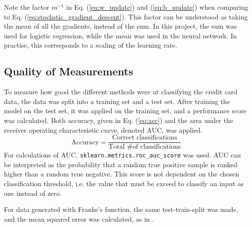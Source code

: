 Note the factor $m^{-1}$ in Eq. (\ref{eq:w_update}) and (\ref{eq:b_update}) when comparing to Eq. (\ref{eq:stochstic_gradient_descent}). This factor can be understood as taking the mean of all the gradients, instead of the sum. In this project, the sum was used for logistic regression, while the mean was used in the neural network. In practise, this corresponds to a scaling of the learning rate.

\subsection{Quality of Measurements}
To measure how good the different methods were at classifying the credit card data, the data was split into a training set and a test set. After training the model on the test set, it was applied on the training set, and a performance score was calculated. Both accuracy, given in Eq. (\ref{eq:acc}) and the area under the receiver operating characteristic curve, denoted AUC, was applied.
\begin{equation}\label{eq:acc}
  \text{Accuracy} = \frac{\text{Correct classifications}}{\text{Total \# of classifications}}
\end{equation}
For calculations of AUC, \texttt{sklearn.metrics.roc\_auc\_score} was used. AUC can be interpreted as the probability that a random true positive sample is ranked higher than a random true negative. This score is not dependent on the chosen classification threshold, i.e. the value that must be exceed to classify an input as one instead of zero.    

For data generated with Franke's function, the same test-train-split was made, and the mean squared error was calculated, as in \cite{prosjekt1}.

